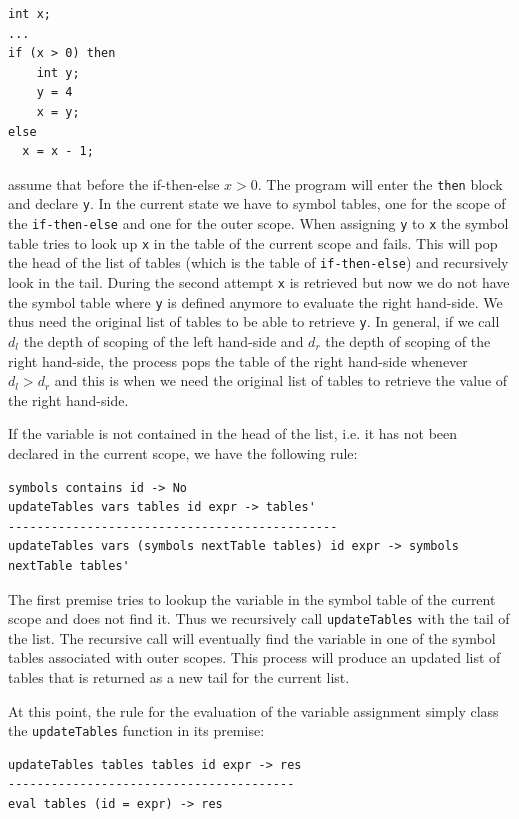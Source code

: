 \begin{lstlisting}[caption = C-{}- sample program, label = code:ch_mcnv_languages_c--_sample_program]
int x;
...
if (x > 0) then
	int y;
	y = 4
	x = y;
else
  x = x - 1;	
\end{lstlisting}

\noindent
assume that before the if-then-else $x > 0$. The program will enter the \texttt{then} block and declare \texttt{y}. In the current state we have to symbol tables, one for the scope of the \texttt{if-then-else} and one for the outer scope. When assigning \texttt{y} to \texttt{x} the symbol table tries to look up \texttt{x} in the table of the current scope and fails. This will pop the head of the list of tables (which is the table of \texttt{if-then-else}) and recursively look in the tail. During the second attempt \texttt{x} is retrieved but now we do not have the symbol table where \texttt{y} is defined anymore to evaluate the right hand-side. We thus need the original list of tables to be able to retrieve \texttt{y}. In general, if we call \texttt{$d_l$} the depth of scoping of the left hand-side and $d_r$ the depth of scoping of the right hand-side, the process pops the table of the right hand-side whenever $d_l > d_r$ and this is when we need the original list of tables to retrieve the value of the right hand-side.

If the variable is not contained in the head of the list, i.e. it has not been declared in the current scope, we have the following rule:

\begin{lstlisting}
symbols contains id -> No
updateTables vars tables id expr -> tables'
----------------------------------------------
updateTables vars (symbols nextTable tables) id expr -> symbols nextTable tables'
\end{lstlisting}

The first premise tries to lookup the variable in the symbol table of the current scope and does not find it. Thus we recursively call \texttt{updateTables} with the tail of the list. The recursive call will eventually find the variable in one of the symbol tables associated with outer scopes. This process will produce an updated list of tables that is returned as a new tail for the current list.

At this point, the rule for the evaluation of the variable assignment simply class the \texttt{updateTables} function in its premise:

\begin{lstlisting}
updateTables tables tables id expr -> res
----------------------------------------
eval tables (id = expr) -> res
\end{lstlisting}

